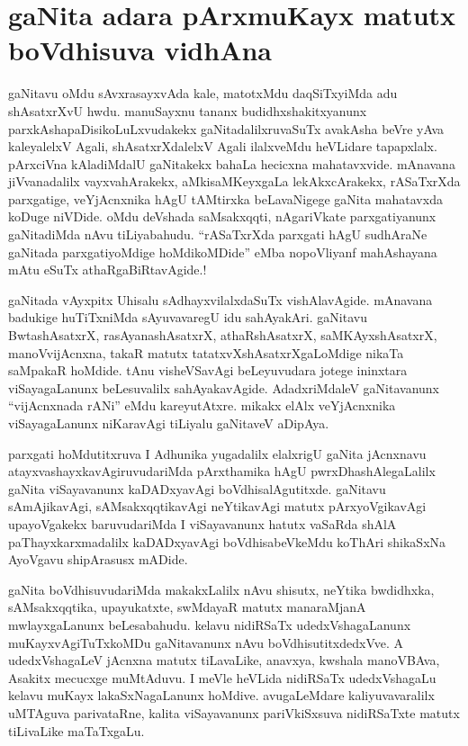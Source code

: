 \chapter{gaNita adara pArxmuKayx matutx boVdhisuva vidhAna}

gaNitavu oMdu sAvxrasayxvAda kale, matotxMdu daqSiTxyiMda adu shAsatxrXvU hwdu. manuSayxnu tananx budidhxshakitxyanunx parxkAshapaDisikoLuLxvudakekx gaNitadalilxruvaSuTx avakAsha beVre yAva kaleyalelxV Agali, shAsatxrXdalelxV Agali ilalxveMdu heVLidare tapapxlalx. pArxciVna kAladiMdalU gaNitakekx bahaLa hecicxna mahatavxvide. mAnavana jiVvanadalilx vayxvahArakekx, aMkisaMKeyxgaLa lekAkxcArakekx, rASaTxrXda parxgatige, veYjAcnxnika hAgU tAMtirxka beLavaNigege gaNita mahatavxda koDuge niVDide. oMdu deVshada saMsakxqqti, nAgariVkate parxgatiyanunx gaNitadiMda nAvu tiLiyabahudu. ``rASaTxrXda parxgati hAgU sudhAraNe gaNitada parxgatiyoMdige hoMdikoMDide'' eMba nopoVliyanf mahAshayana mAtu eSuTx athaRgaBiRtavAgide.!

gaNitada vAyxpitx Uhisalu sAdhayxvilalxdaSuTx vishAlavAgide. mAnavana badukige huTiTxniMda sAyuvavaregU idu sahAyakAri. gaNitavu BwtashAsatxrX, rasAyanashAsatxrX, athaRshAsatxrX, saMKAyxshAsatxrX, manoVvijAcnxna, takaR matutx tatatxvXshAsatxrXgaLoMdige nikaTa saMpakaR hoMdide. tAnu visheVSavAgi beLeyuvudara jotege ininxtara viSayagaLanunx beLesuvalilx sahAyakavAgide. AdadxriMdaleV gaNitavanunx ``vijAcnxnada rANi'' eMdu kareyutAtxre. mikakx elAlx veYjAcnxnika viSayagaLanunx niKaravAgi tiLiyalu gaNitaveV aDipAya.

parxgati hoMdutitxruva I Adhunika yugadalilx elalxrigU gaNita jAcnxnavu atayxvashayxkavAgiruvudariMda pArxthamika hAgU pwrxDhashAlegaLalilx gaNita viSayavanunx kaDADxyavAgi boVdhisalAgutitxde. gaNitavu sAmAjikavAgi, sAMsakxqqtikavAgi neYtikavAgi matutx pArxyoVgikavAgi upayoVgakekx baruvudariMda I viSayavanunx hatutx vaSaRda shAlA paThayxkarxmadalilx kaDADxyavAgi boVdhisabeVkeMdu koThAri shikaSxNa AyoVgavu shipArasusx mADide.

gaNita boVdhisuvudariMda makakxLalilx nAvu shisutx, neYtika bwdidhxka, sAMsakxqqtika, upayukatxte, swMdayaR matutx manaraMjanA mwlayxgaLanunx beLesabahudu. kelavu nidiRSaTx udedxVshagaLanunx muKayxvAgiTuTxkoMDu gaNitavanunx nAvu boVdhisutitxdedxVve. A udedxVshagaLeV jAcnxna matutx tiLavaLike, anavxya, kwshala manoVBAva, Asakitx mecucxge muMtAduvu. I meVle heVLida nidiRSaTx udedxVshagaLu kelavu muKayx lakaSxNagaLanunx hoMdive. avugaLeMdare kaliyuvavaralilx uMTAguva parivataRne, kalita viSayavanunx pariVkiSxsuva nidiRSaTxte matutx tiLivaLike maTaTxgaLu.

